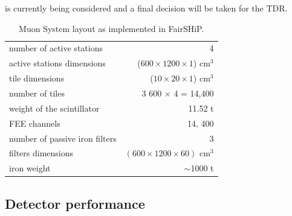 is currently being considered and a final decision will be taken for the TDR.
\begin{table}[htbp]
\caption{Muon System layout as implemented in FairSHiP.}
\label{tab:muon_layout}
\vspace{.1cm}
\begin{center}
\begin{small}
\begin{tabular}{lr}
\hline
number of active stations  & 4 \\
active stations dimensions  & ($600 \times 1200 \times 1$) cm$^3$ \\
tile dimensions   & ($10 \times 20 \times 1$) cm$^3$ \\
number of tiles   &  3 600 $\times$ 4 = 14,400\\
weight of the scintillator & 11.52 t \\
FEE channels      &  14, 400 \\ \hline
number of passive iron filters   & 3 \\
filters dimensions  & $ (600 \times 1200 \times 60) $ cm$^3$ \\
iron weight   & $\sim$1000 t \\
\hline
\end{tabular}
\end{small}
\end{center}
\end{table}


\subsection{Detector performance}
\label{DSperformance}


